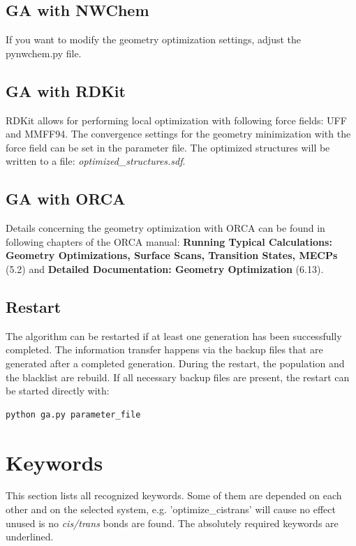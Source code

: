 \documentclass[a4paper]{article}
\begin{document}
\subsection{GA with NWChem}
If you want to modify the geometry optimization settings, adjust the pynwchem.py file. 
\subsection{GA with RDKit} 
RDKit allows for performing local optimization with following force fields: UFF and MMFF94. The convergence settings for the geometry minimization with the force field can be set in the parameter file. The optimized structures will be written to a file: \textit{optimized\_structures.sdf}. 

\subsection{GA with ORCA} 
Details concerning the geometry optimization with ORCA can be found in following chapters of the ORCA manual: \textbf{Running Typical Calculations: Geometry Optimizations, Surface Scans, Transition States, MECPs} (5.2) and \textbf{Detailed Documentation: Geometry Optimization} (6.13). 

\subsection{Restart}
The algorithm can be restarted if at least one generation has been successfully completed. The information transfer happens via the backup files that are generated after a completed generation. During the restart, the population and the blacklist are rebuild. If all necessary backup files are present, the restart can be started directly with:

\begin{verbatim}
python ga.py parameter_file
\end{verbatim}





\section{Keywords}

This section lists all recognized keywords. Some of them are depended on each other and on the selected system, e.g. 'optimize\_cistrans' will cause no effect unused is no \textit{cis/trans} bonds are found. The absolutely required keywords are underlined. 
\vspace{10pt}
\end{document}
